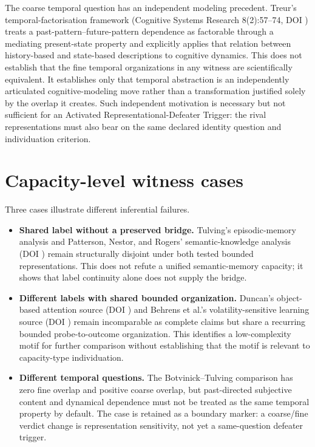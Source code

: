 \documentclass[11pt]{article}
\begin{document}
The coarse temporal question has an independent modeling precedent. Treur's temporal-factorisation framework (Cognitive Systems Research 8(2):57--74, DOI ) treats a past-pattern--future-pattern dependence as factorable through a mediating present-state property and explicitly applies that relation between history-based and state-based descriptions to cognitive dynamics. This does not establish that the fine temporal organizations in any witness are scientifically equivalent. It establishes only that temporal abstraction is an independently articulated cognitive-modeling move rather than a transformation justified solely by the overlap it creates. Such independent motivation is necessary but not sufficient for an Activated Representational-Defeater Trigger: the rival representations must also bear on the same declared identity question and individuation criterion.

\section{Capacity-level witness cases}

Three cases illustrate different inferential failures.

\begin{itemize}[leftmargin=*]
\item \textbf{Shared label without a preserved bridge.} Tulving's episodic-memory analysis and Patterson, Nestor, and Rogers' semantic-knowledge analysis (DOI ) remain structurally disjoint under both tested bounded representations. This does not refute a unified semantic-memory capacity; it shows that label continuity alone does not supply the bridge.
\item \textbf{Different labels with shared bounded organization.} Duncan's object-based attention source (DOI ) and Behrens et al.'s volatility-sensitive learning source (DOI ) remain incomparable as complete claims but share a recurring bounded probe-to-outcome organization. This identifies a low-complexity motif for further comparison without establishing that the motif is relevant to capacity-type individuation.
\item \textbf{Different temporal questions.} The Botvinick--Tulving comparison has zero fine overlap and positive coarse overlap, but past-directed subjective content and dynamical dependence must not be treated as the same temporal property by default. The case is retained as a boundary marker: a coarse/fine verdict change is representation sensitivity, not yet a same-question defeater trigger.
\end{itemize}
\end{document}
